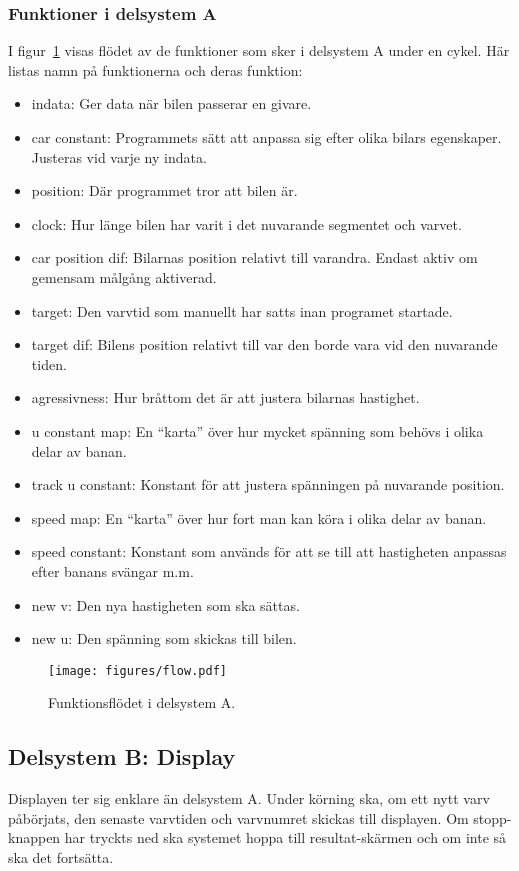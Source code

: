     \subsubsection{Funktioner i delsystem A} \label{sec:system_a_funcs}
    I figur~\ref{fig:flow_diagram}  visas flödet av de funktioner som sker i delsystem A under en cykel.
    Här listas namn på funktionerna och deras funktion:
    \begin{itemize}
      \item indata: Ger data när bilen passerar en givare.
      \item car constant: Programmets sätt att anpassa sig efter olika bilars egenskaper. Justeras vid varje ny indata.
      \item position: Där programmet tror att bilen är.
      \item clock: Hur länge bilen har varit i det nuvarande segmentet och varvet.
      \item car position dif: Bilarnas position relativt till varandra. Endast aktiv om gemensam målgång aktiverad.
      \item target: Den varvtid som manuellt har satts inan programet startade.
      \item target dif: Bilens position relativt till var den borde vara vid den nuvarande tiden.
      \item agressivness: Hur bråttom det är att justera bilarnas hastighet.
      \item u constant map: En ``karta'' över hur mycket spänning som behövs i olika delar av banan.
      \item track u constant: Konstant för att justera spänningen på nuvarande position.
      \item speed map: En ``karta'' över hur fort man kan köra i olika delar av banan.
      \item speed constant: Konstant som används för att se till att hastigheten anpassas efter banans svängar m.m.
      \item new v: Den nya hastigheten som ska sättas.
      \item new u: Den spänning som skickas till bilen.
    \end{itemize}

    \begin{figure}
      \centering
      \texttt{[image: figures/flow.pdf]}
      \caption{Funktionsflödet i delsystem A.}%
      \label{fig:flow_diagram}
    \end{figure}

  \subsection{Delsystem B: Display}

  Displayen ter sig enklare än delsystem A. Under körning ska, om ett nytt varv
  påbörjats, den senaste varvtiden och varvnumret skickas till displayen. Om
  stopp-knappen har tryckts ned ska systemet hoppa till resultat-skärmen och om
  inte så ska det fortsätta.

